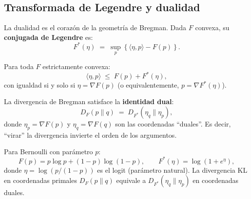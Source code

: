 \subsection{Transformada de Legendre y dualidad}

La dualidad es el corazón de la geometría de Bregman.  Dada $F$ convexa, su \textbf{conjugada de Legendre} es:
\[
F^*(\eta) \;=\; \sup_p \left\{ \langle \eta, p \rangle - F(p) \right\}.
\]

\begin{theorem}
	Para toda $F$ estrictamente convexa:
	\[
	\langle \eta, p \rangle \;\le\; F(p) + F^*(\eta),
	\]
	con igualdad si y solo si $\eta = \nabla F(p)$ (o equivalentemente, $p = \nabla F^*(\eta)$).
\end{theorem}

\begin{theorem}
	La divergencia de Bregman satisface la \textbf{identidad dual}:
	\[
	D_F(p \| q) \;=\; D_{F^*}(\eta_q \| \eta_p),
	\]
	donde $\eta_p = \nabla F(p)$ y $\eta_q = \nabla F(q)$ son las coordenadas ``duales''.  Es decir, ``virar'' la divergencia invierte el orden de los argumentos.
\end{theorem}

\begin{center}
\end{center}

\begin{example}
	Para Bernoulli con parámetro $p$:
	\[
	F(p) = p \log p + (1-p) \log(1-p), \qquad F^*(\eta) = \log(1 + e^\eta),
	\]
	donde $\eta = \log(p/(1-p))$ es el logit (parámetro natural).  La divergencia KL en coordenadas primales $D_F(p \| q)$ equivale a $D_{F^*}(\eta_q \| \eta_p)$ en coordenadas duales.
\end{example}

